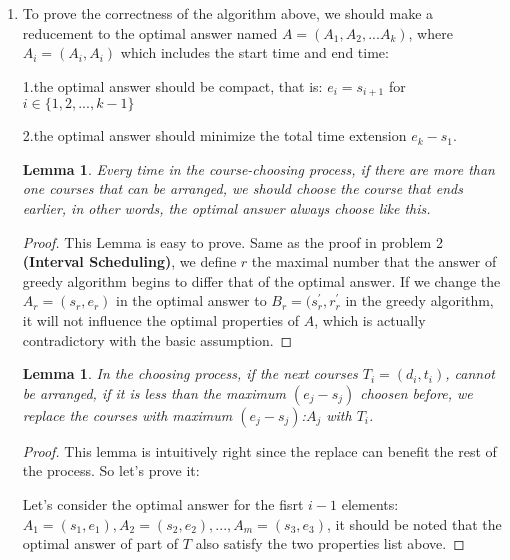 \documentclass[12pt,a4paper]{article}
\makeatletter
\newtheorem{lemma}[theorem]{Lemma}
\newtheorem*{solution}{Solution}
\theoremstyle{definition}
\renewenvironment{solution}[1][Solution] {\par\pushQED{\qed}\normalfont\topsep6\p@\@plus6\p@\relax\trivlist\item[\hskip\labelsep\bfseries#1\@addpunct{.}]\ignorespaces}{\popQED\endtrivlist\@endpefalse} \makeatother
\makeatother
\begin{document}
\begin{enumerate}
\begin{minipage}[t]{0.80\textwidth}
\begin{algorithm}[H]
{          
       }
   \end{algorithm}
\end{minipage}

    \begin{solution}
      To prove the correctness of the algorithm above, we should make a reducement to the optimal answer named $A = (A_1, A_2, ...A_k)$, where $A_i=(A_i, A_i)$ which includes the start time and end time:


      1.the optimal answer should be compact, that is: $e_i = s_{i+1}$ for $i\in\{1, 2, ..., k-1\}$ 

      2.the optimal answer should minimize the total time extension $e_{k} - s_1$.
      
      \begin{lemma}
          Every time in the course-choosing process, if there are more than one courses that can be arranged, we should choose the course that ends earlier, in other words, the optimal answer always choose like this.         
      \end{lemma}

      \begin{proof}
           This Lemma is easy to prove. Same as the proof in problem 2 \textbf{(Interval Scheduling)}, we define $r$ the maximal number that the answer of greedy algorithm begins to differ that of the optimal answer. If we change the $A_r=(s_r, e_r)$ in the optimal answer to $B_r=(s_r^{'}, r_r^{'}$ in the greedy algorithm, it will not influence the optimal properties of $A$, which is actually contradictory with the basic assumption. 
      \end{proof}
      
      \begin{lemma}
          In the choosing process, if the next courses $T_i = (d_i, t_i)$, cannot be arranged, if it is less than the maximum $(e_j - s_j)$ choosen before, we replace the courses with maximum $(e_j - s_j)$:$A_j$ with $T_i$.
      \end{lemma}

      \begin{proof}
         This lemma is intuitively right since the replace can benefit the rest of the process. So let's prove it:

         Let's consider the optimal answer for the fisrt $i-1$ elements: $A_1=(s_1, e_1), A_2=(s_2, e_2), ..., A_m=(s_3, e_3)$, it should be noted that the optimal answer of part of $T$ also satisfy the two properties list above.


\end{proof}
\end{solution}
\end{enumerate}
\end{document}
